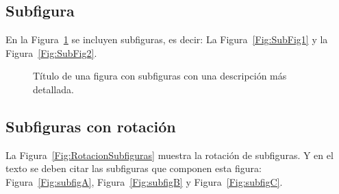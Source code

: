 \subsection{Subfigura}
En la Figura~\ref{Fig:SubfigurasEjemplo} se incluyen subfiguras, es decir: La Figura~\ref{Fig:SubFig1} y la Figura~\ref{Fig:SubFig2}. 


\begin{figure}[htp]
   \centering
   \hspace{0.05\linewidth}
   \caption[Título de una figura con subfiguras.]%
    {Título de una figura con subfiguras con una descripción más detallada. \lipsum[5]}
   \label{Fig:SubfigurasEjemplo} %
\end{figure}


\subsection{Subfiguras con rotación}
La Figura~\ref{Fig:RotacionSubfiguras} muestra la rotación de subfiguras. Y en el texto se deben citar las subfiguras que componen esta figura: Figura~\ref{Fig:subfigA}, Figura~\ref{Fig:subfigB} y Figura~\ref{Fig:subfigC}.


\begin{sidewaysfigure}[htp]
   \centering
   \hspace{0.05\linewidth}
   \hspace{0.05\linewidth}
   \caption[Título de una figura con subfiguras con rotación.]%
    {Título de naa figura con subfiguras con rotación con una descripción más detallada. \lipsum[5]} %
   \label{Fig:RotacionSubfiguras} %
\end{sidewaysfigure}



